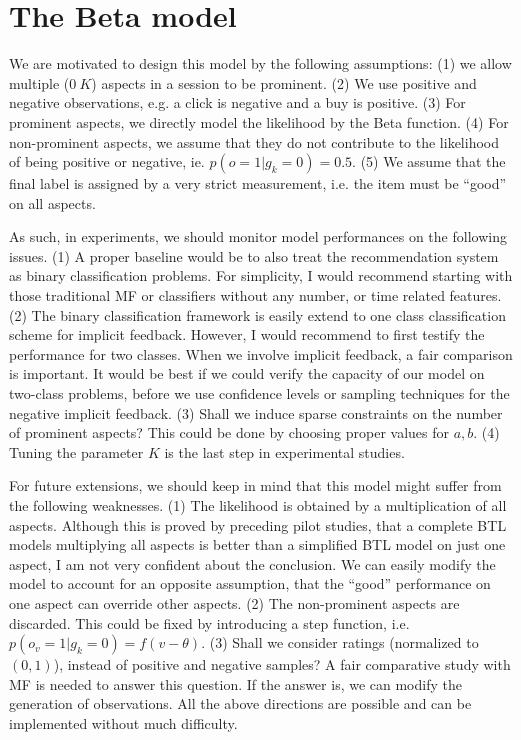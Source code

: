 \documentclass[11pt]{report}
\begin{document}
\section{The Beta model}
 We are motivated to design this model by the following assumptions: (1) we allow  multiple ($0~K$) aspects in a session to be prominent. (2) We use positive and negative observations, e.g. a click is negative and a buy is positive. (3) For prominent aspects, we directly model the likelihood by the Beta function. (4) For non-prominent aspects, we assume that they do not contribute to the likelihood of being positive or negative, ie. $p(o=1|g_k=0)=0.5$.  (5) We assume that the final label is assigned by a very strict measurement, i.e. the item must be ``good'' on all aspects.
 
As such, in experiments, we should monitor model performances on the following issues. (1) A proper baseline would be to also treat the recommendation system as binary classification problems. For simplicity, I would recommend starting with those traditional MF or classifiers without any number, or time related features. (2) The binary classification framework is easily extend to one class classification scheme for implicit feedback. However, I would recommend to first testify the performance for two classes. When we involve implicit feedback, a fair comparison is important. It would be best if we could verify the capacity of our model on two-class problems, before we use confidence levels or sampling techniques for the negative implicit feedback. (3) Shall we induce sparse constraints on the number of prominent aspects? This could be done by choosing proper values for $a,b$.  (4) Tuning the parameter $K$ is the last step in experimental studies.
 
For future extensions, we should keep in mind that this model might suffer from the following weaknesses. (1) The likelihood is obtained by a multiplication of all aspects. Although this is proved by preceding pilot studies, that a complete BTL models multiplying all aspects is better than a simplified BTL model on just one aspect, I am not very confident about the conclusion. We can easily modify the model to account for an opposite assumption, that the ``good'' performance on one aspect can override other aspects.  (2) The non-prominent aspects are discarded. This could be fixed by introducing a step function, i.e. $p(o_v=1|g_k=0)=f(v-\theta)$.  (3)  Shall we consider ratings (normalized to $(0,1)$), instead of positive and negative samples? A fair comparative study with MF is needed to answer this question.  If the answer is, we can modify the generation of observations. All the above directions are possible and can be implemented without much difficulty.
 
\end{document}
